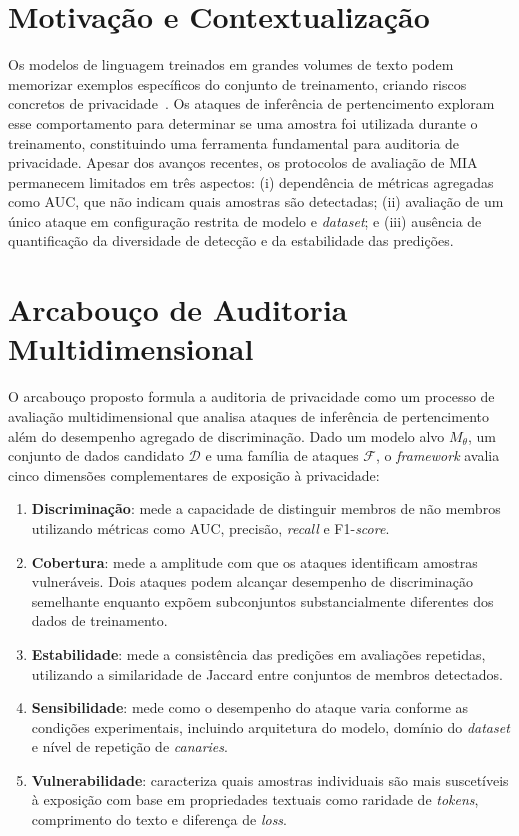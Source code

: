 \documentclass[
	12pt,				%
	openright,			%
	oneside,			%
	a4paper,			%
	english,			%
	french,				%
	spanish,			%
	brazil,				%
	]{abntex2}
\begin{document}
\section{Motivação e Contextualização}

Os modelos de linguagem treinados em grandes volumes de texto podem memorizar exemplos específicos do conjunto de treinamento, criando riscos concretos de privacidade~\cite{carlini2019secret}. Os ataques de inferência de pertencimento exploram esse comportamento para determinar se uma amostra foi utilizada durante o treinamento, constituindo uma ferramenta fundamental para auditoria de privacidade. Apesar dos avanços recentes, os protocolos de avaliação de MIA permanecem limitados em três aspectos: (i) dependência de métricas agregadas como AUC, que não indicam quais amostras são detectadas; (ii) avaliação de um único ataque em configuração restrita de modelo e \textit{dataset}; e (iii) ausência de quantificação da diversidade de detecção e da estabilidade das predições.

\section{Arcabouço de Auditoria Multidimensional}
\label{sec:framework_auditoria}

O arcabouço proposto formula a auditoria de privacidade como um processo de avaliação multidimensional que analisa ataques de inferência de pertencimento além do desempenho agregado de discriminação. Dado um modelo alvo $M_\theta$, um conjunto de dados candidato $\mathcal{D}$ e uma família de ataques $\mathcal{F}$, o \textit{framework} avalia cinco dimensões complementares de exposição à privacidade:

\begin{enumerate}[label=(\roman*)]
    \item \textbf{Discriminação}: mede a capacidade de distinguir membros de não membros utilizando métricas como AUC, precisão, \textit{recall} e F1-\textit{score}.
    \item \textbf{Cobertura}: mede a amplitude com que os ataques identificam amostras vulneráveis. Dois ataques podem alcançar desempenho de discriminação semelhante enquanto expõem subconjuntos substancialmente diferentes dos dados de treinamento.
    \item \textbf{Estabilidade}: mede a consistência das predições em avaliações repetidas, utilizando a similaridade de Jaccard entre conjuntos de membros detectados.
    \item \textbf{Sensibilidade}: mede como o desempenho do ataque varia conforme as condições experimentais, incluindo arquitetura do modelo, domínio do \textit{dataset} e nível de repetição de \textit{canaries}.
    \item \textbf{Vulnerabilidade}: caracteriza quais amostras individuais são mais suscetíveis à exposição com base em propriedades textuais como raridade de \textit{tokens}, comprimento do texto e diferença de \textit{loss}.
\end{enumerate}
\end{document}
